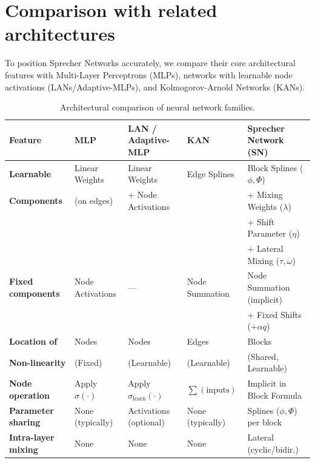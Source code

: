 \documentclass{article}
\theoremstyle{plain}
\theoremstyle{definition}
\theoremstyle{remark}
\begin{document}
\section{Comparison with related architectures}
To position Sprecher Networks accurately, we compare their core architectural features with Multi-Layer Perceptrons (MLPs), networks with learnable node activations (LANs/Adaptive-MLPs), and Kolmogorov-Arnold Networks (KANs).

\begin{table}[ht]
\centering
\caption{Architectural comparison of neural network families.}
\label{tab:arch_comparison}
\small %
\begin{tabular}{@{}lllll@{}}
\toprule
Feature                   & MLP                 & LAN / Adaptive-MLP & KAN                   & Sprecher Network (SN) \\ \midrule
\textbf{Learnable}        & Linear Weights      & Linear Weights     & Edge Splines          & Block Splines ($\phi, \Phi$) \\
\textbf{Components}       & (on edges)          & + Node Activations &                       & + Mixing Weights ($\lambda$) \\
                          &                     &                    &                       & + Shift Parameter ($\eta$) \\
                          &                     &                    &                       & + Lateral Mixing ($\tau, \omega$) \\
\textbf{Fixed components}   & Node Activations    & ---                & Node Summation        & Node Summation (implicit) \\
                          &                     &                    &                       & + Fixed Shifts ($+\alpha q$) \\
\textbf{Location of}      & Nodes               & Nodes              & Edges                 & Blocks \\
\textbf{Non-linearity}    & (Fixed)             & (Learnable)        & (Learnable)           & (Shared, Learnable) \\
\textbf{Node operation}     & Apply $\sigma(\cdot)$ & Apply $\sigma_{\text{learn}}(\cdot)$ & $\sum (\text{inputs})$ & Implicit in Block Formula \\
\textbf{Parameter sharing}  & None (typically)    & Activations (optional) & None (typically)      & Splines ($\phi, \Phi$) per block \\
\textbf{Intra-layer mixing} & None & None & None & Lateral (cyclic/bidir.) \\

\end{tabular}
\end{table}
\end{document}

